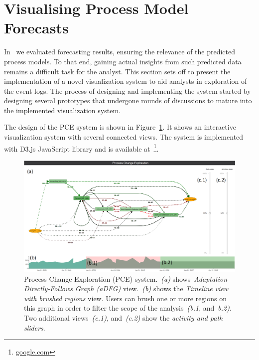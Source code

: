 \section{Visualising Process Model Forecasts}\label{sec:visualisation}

In~ we evaluated forecasting results, ensuring the relevance of the predicted process models. To that end, gaining actual insights from such predicted data remains a difficult task for the analyst. This section sets off to present the implementation of a novel visualization system to aid analysts in exploration of the event logs. The process of designing and implementing the system started by designing several prototypes that undergone rounds of discussions to mature into the implemented visualization system. 

The design of the PCE system is shown in Figure~\ref{fig:vis-two-brushes}. It shows an interactive visualization system with several connected views. The system is implemented with D3.js JavaScript library and is available at~\footnote{\url{google.com}}.


\begin{figure}
	\centering
	\includegraphics[width=\textwidth]{img/vis/actual-predicted-two-brushed-regions-system.PNG}
	\caption{Process Change Exploration (PCE) system.~\emph{(a)} shows~\emph{Adaptation Directly-Follows Graph (aDFG)} view.~\emph{(b)} shows the \emph{Timeline view with brushed regions} view. Users can brush one or more regions on this graph in order to filter the scope of the analysis~\emph{(b.1}, and~\emph{b.2)}. Two additional views~\emph{(c.1)}, and~\emph{(c.2)} show the \emph{activity and path sliders}.} 
	\label{fig:vis-two-brushes}
\end{figure}